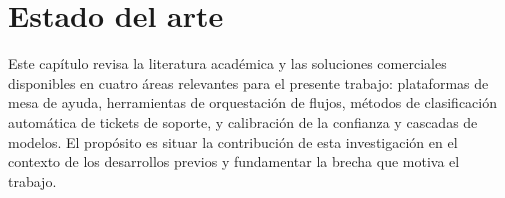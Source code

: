 \section{Estado del arte}\label{sec:estado-del-arte}

Este capítulo revisa la literatura académica y las soluciones comerciales disponibles en cuatro áreas relevantes para el presente trabajo: plataformas de mesa de ayuda, herramientas de orquestación de flujos, métodos de clasificación automática de tickets de soporte, y calibración de la confianza y cascadas de modelos. El propósito es situar la contribución de esta investigación en el contexto de los desarrollos previos y fundamentar la brecha que motiva el trabajo.

